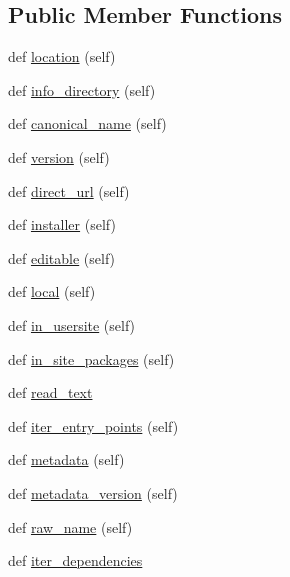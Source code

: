 \subsection*{Public Member Functions}
\begin{DoxyCompactItemize}
\item 
def \hyperlink{classpip_1_1__internal_1_1metadata_1_1base_1_1BaseDistribution_abb1963545a57b9183e6e71a61e44a967}{location} (self)
\item 
def \hyperlink{classpip_1_1__internal_1_1metadata_1_1base_1_1BaseDistribution_a51d7cd4e432b78ef9f83ac872d982adb}{info\+\_\+directory} (self)
\item 
def \hyperlink{classpip_1_1__internal_1_1metadata_1_1base_1_1BaseDistribution_aeda5b610c7265a5a289a6daba0fe1f34}{canonical\+\_\+name} (self)
\item 
def \hyperlink{classpip_1_1__internal_1_1metadata_1_1base_1_1BaseDistribution_a846fd2ebbbde8b3bfd7d9e4c8361c18c}{version} (self)
\item 
def \hyperlink{classpip_1_1__internal_1_1metadata_1_1base_1_1BaseDistribution_a4c40560e1449ed313f3d426421ee0d3a}{direct\+\_\+url} (self)
\item 
def \hyperlink{classpip_1_1__internal_1_1metadata_1_1base_1_1BaseDistribution_abd4aac6ed6c320b773d64e1458877f81}{installer} (self)
\item 
def \hyperlink{classpip_1_1__internal_1_1metadata_1_1base_1_1BaseDistribution_ab4c85380761e4be4b6fb8c2eb561ec56}{editable} (self)
\item 
def \hyperlink{classpip_1_1__internal_1_1metadata_1_1base_1_1BaseDistribution_a876cfdca508a216f89be3cd4bdc6e13f}{local} (self)
\item 
def \hyperlink{classpip_1_1__internal_1_1metadata_1_1base_1_1BaseDistribution_abb6d2e3f559bfc53dabd359781c1d8a7}{in\+\_\+usersite} (self)
\item 
def \hyperlink{classpip_1_1__internal_1_1metadata_1_1base_1_1BaseDistribution_a1030562fd7df166c2136e82520b9a053}{in\+\_\+site\+\_\+packages} (self)
\item 
def \hyperlink{classpip_1_1__internal_1_1metadata_1_1base_1_1BaseDistribution_aa2058681263c5b1aa2e4e7fc2342713b}{read\+\_\+text}
\item 
def \hyperlink{classpip_1_1__internal_1_1metadata_1_1base_1_1BaseDistribution_a00a9728225458f1c09eaab6e132aa38a}{iter\+\_\+entry\+\_\+points} (self)
\item 
def \hyperlink{classpip_1_1__internal_1_1metadata_1_1base_1_1BaseDistribution_a21b0254c823585d91ff68fe633d4a27f}{metadata} (self)
\item 
def \hyperlink{classpip_1_1__internal_1_1metadata_1_1base_1_1BaseDistribution_aed3daf5e06155d6bbd467c3130bacaaf}{metadata\+\_\+version} (self)
\item 
def \hyperlink{classpip_1_1__internal_1_1metadata_1_1base_1_1BaseDistribution_aad9381dfa99f1624a9cc1d5c7a396065}{raw\+\_\+name} (self)
\item 
def \hyperlink{classpip_1_1__internal_1_1metadata_1_1base_1_1BaseDistribution_a23234701cfb484f8e9eed299deb89e67}{iter\+\_\+dependencies}
\end{DoxyCompactItemize}


